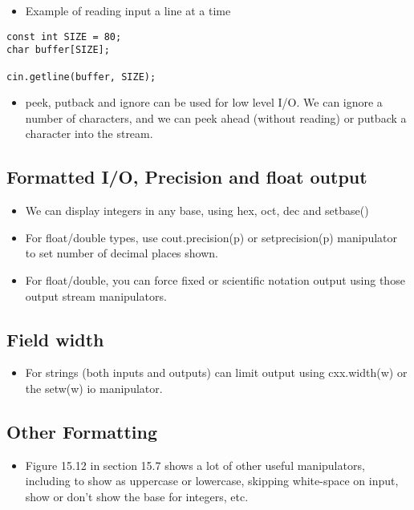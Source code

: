\documentclass[11pt]{article}
\begin{document}
\begin{itemize}
\item Example of reading input a line at a time
\end{itemize}

\begin{verbatim}
const int SIZE = 80;
char buffer[SIZE];

cin.getline(buffer, SIZE);
\end{verbatim}

\begin{itemize}
\item peek, putback and ignore can be used for low level I/O.  We can
ignore a number of characters, and we can peek ahead (without
reading) or putback a character into the stream.
\end{itemize}
\subsection{Formatted I/O, Precision and float output}
\label{sec-1-5}

\begin{itemize}
\item We can display integers in any base,  using hex, oct, dec and setbase()
\item For float/double types, use cout.precision(p) or setprecision(p) 
manipulator to set number of decimal places shown.
\item For float/double, you can force fixed or scientific notation output
using those output stream manipulators.
\end{itemize}
\subsection{Field width}
\label{sec-1-6}

\begin{itemize}
\item For strings (both inputs and outputs) can limit output using
cxx.width(w) or the setw(w) io manipulator.
\end{itemize}
\subsection{Other Formatting}
\label{sec-1-7}

\begin{itemize}
\item Figure 15.12 in section 15.7 shows a lot of other useful manipulators,
including to show as uppercase or lowercase, skipping white-space on input,
show or don't show the base for integers, etc.
\end{itemize}
\end{document}
